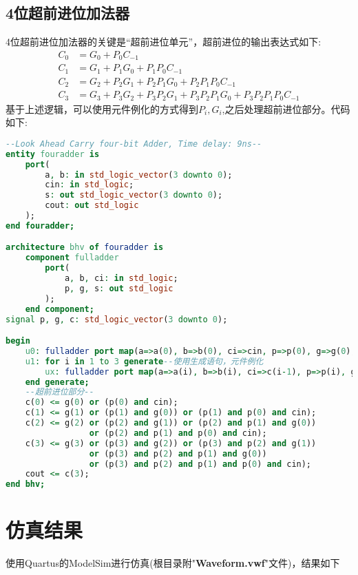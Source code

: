 \documentclass[UTF8, onecolumn, a4paper]{article}
\begin{document}
\subsection{4位超前进位加法器}
4位超前进位加法器的关键是“超前进位单元”，超前进位的输出表达式如下:
\begin{equation*}
\begin{aligned}
	C_0 &= G_0 + P_0C_{-1}\\
	C_1 &= G_1 + P_1G_0 + P_1P_0C_{-1}\\
	C_2 &= G_2 + P_2G_1 + P_2P_1G_0 + P_2P_1P_0C_{-1}\\
	C_3 &= G_3 + P_3G_2 + P_3P_2G_1 + P_3P_2P_1G_0 + P_3P_2P_1P_0C_{-1}
\end{aligned}
\end{equation*}
基于上述逻辑，可以使用元件例化的方式得到$P_i, G_i$,之后处理超前进位部分。代码如下:
\begin{lstlisting}[language={VHDL}, title={fouradder.vhd}]
--Look Ahead Carry four-bit Adder, Time delay: 9ns--
entity fouradder is
	port(
		a, b: in std_logic_vector(3 downto 0);
		cin: in std_logic;
		s: out std_logic_vector(3 downto 0);
		cout: out std_logic
	);
end fouradder;

architecture bhv of fouradder is
	component fulladder
		port(
			a, b, ci: in std_logic;
			p, g, s: out std_logic
		);
	end component;
signal p, g, c: std_logic_vector(3 downto 0);

begin
	u0: fulladder port map(a=>a(0), b=>b(0), ci=>cin, p=>p(0), g=>g(0), s=>s(0));
	u1: for i in 1 to 3 generate--使用生成语句，元件例化
		ux: fulladder port map(a=>a(i), b=>b(i), ci=>c(i-1), p=>p(i), g=>g(i), s=>s(i));
	end generate;
	--超前进位部分--
	c(0) <= g(0) or (p(0) and cin);
	c(1) <= g(1) or (p(1) and g(0)) or (p(1) and p(0) and cin);
	c(2) <= g(2) or (p(2) and g(1)) or (p(2) and p(1) and g(0)) 
				 or (p(2) and p(1) and p(0) and cin);
	c(3) <= g(3) or (p(3) and g(2)) or (p(3) and p(2) and g(1)) 
				 or (p(3) and p(2) and p(1) and g(0)) 
				 or (p(3) and p(2) and p(1) and p(0) and cin);
	cout <= c(3);
end bhv;
\end{lstlisting}

\section{仿真结果}
使用Quartus的ModelSim进行仿真(根目录附"\textbf{Waveform.vwf}"文件)，结果如下
\begin{figure}[htb]
	\centering
\end{figure}
\end{document}
